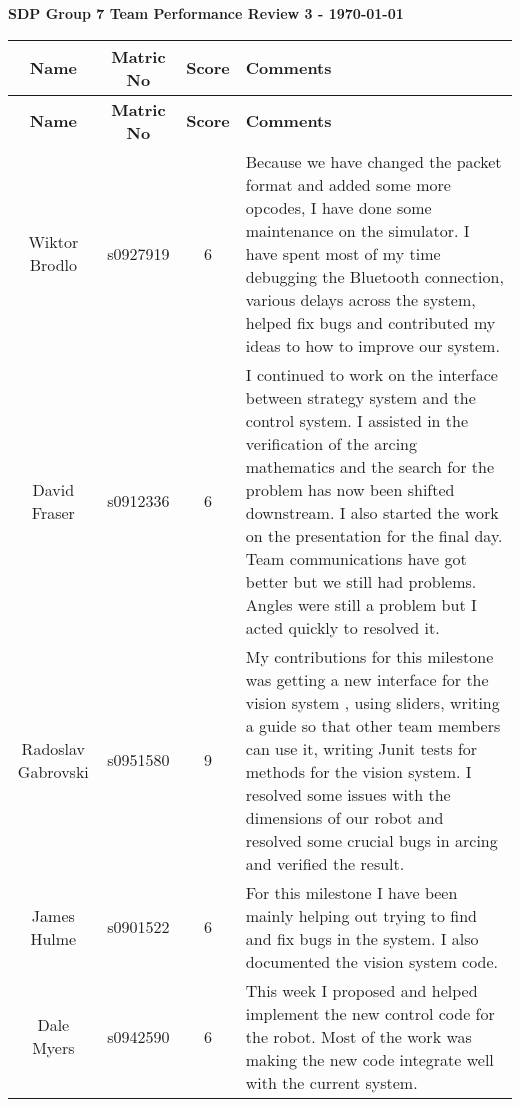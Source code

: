\documentclass[10pt, a4paper]{article} %
\begin{document}
\textbf{SDP Group 7 Team Performance Review 3 - \today}


\begin{longtable}{c c c p{16cm}}
    \textbf{Name} &
    \textbf{Matric No} &
    \textbf{Score} &
    \textbf{Comments}\\
    \hline
    \endfirsthead


    \textbf{Name} &
    \textbf{Matric No} &
    \textbf{Score} &
    \textbf{Comments}\\
    \hline
    \endhead

    Wiktor Brodlo &
    s0927919 &
    6&
    Because we have changed the packet format and added some more opcodes,
    I have done some maintenance on the simulator. I have spent most of my time
    debugging the Bluetooth connection, various delays across the system,
    helped fix bugs and contributed my ideas to how to improve our system.\\



    David Fraser &
    s0912336 &
    6&
    I continued to work on the interface between strategy system and the
    control system.  I assisted in the verification of the arcing mathematics
    and the search for the problem has now been shifted downstream. I also started
    the work on the presentation for the final day. Team communications have
    got better but we still had problems. Angles were still a problem but
    I acted quickly to resolved it.\\

    Radoslav Gabrovski &
    s0951580 &
    9& 
   My contributions for this milestone was getting a new interface for the
   vision system , using sliders, writing a guide so that other team members
   can use it, writing Junit tests for methods for the vision system.
   I resolved some issues with the dimensions of our robot and resolved some
   crucial bugs in arcing and verified the result.\\


    James Hulme &
    s0901522 &
    6& 
    For this milestone I have been mainly helping out trying to find and fix bugs
    in the system. I also documented the vision system code.\\

    Dale Myers &
    s0942590 &
    6&
    This week I proposed and helped implement the new control code for the
    robot. Most of the work was making the new code integrate well with the
    current system.\\



\end{longtable}
\end{document}
